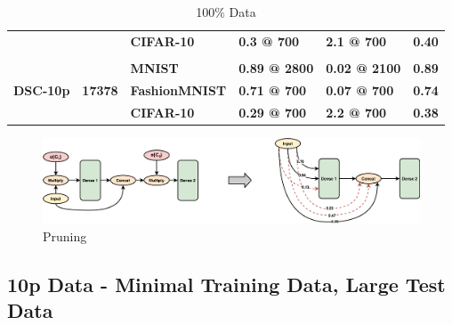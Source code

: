 \documentclass{article}
\begin{document}
\begin{table}[H]
\begin{tabular}{llllll}
\textbf{}                         & \textbf{}                       & \textbf{CIFAR-10}        & \textbf{0.3 @ 700}   & \textbf{2.1 @ 700}   & \textbf{0.40}            \\
                                  &                                 &                          &                      &                      &                          \\
\multirow{3}{*}{\textbf{DSC-10p}} & \multirow{3}{*}{\textbf{17378}} & \textbf{MNIST}           & \textbf{0.89 @ 2800} & \textbf{0.02 @ 2100} & \textbf{0.89}            \\
                                  &                                 & \textbf{FashionMNIST}    & \textbf{0.71 @ 700}  & \textbf{0.07 @ 700}  & \textbf{0.74}            \\
                                  &                                 & \textbf{CIFAR-10}        & \textbf{0.29 @ 700}  & \textbf{2.2 @ 700}   & \textbf{0.38}            \\ \cmidrule(l){3-6} 
\end{tabular}
\caption{100\% Data}
\label{tab:my-table}
\end{table}



\begin{figure}[h!]
\centering
\includegraphics[scale=0.1]{Pruning.png}
\caption{Pruning}
\label{fig:infotransfer}
\end{figure}




\subsection{10p Data - Minimal Training Data, Large Test Data}
\end{document}

